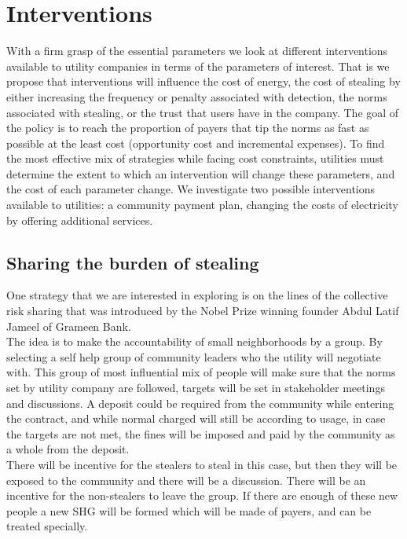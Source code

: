 \documentclass{article}
\begin{document}
\section{Interventions}
With a firm grasp of the essential parameters we look at different interventions available to utility companies in terms of the parameters of interest. That is we propose that interventions will influence the cost of energy, the cost of stealing by either increasing the frequency or penalty associated with detection, the norms associated with stealing, or the trust that users have in the company. The goal of the policy is to reach the proportion of payers that tip the norms as fast as possible at the least cost (opportunity cost and incremental expenses). To find the most effective mix of strategies while facing cost constraints, utilities must determine the extent to which an intervention will change these parameters, and the cost of each parameter change. We investigate two possible interventions available to utilities: a community payment plan, changing the costs of electricity by offering additional services. 

\listoftodos

\subsection{Sharing the burden of stealing}
One strategy that we are interested in exploring is on the lines of the collective risk sharing that was introduced by the Nobel Prize winning founder Abdul Latif Jameel of Grameen Bank. \\

The idea is to make the accountability of small neighborhoods by a group. By selecting a self help group of community leaders who the utility will negotiate with. This group of most influential mix of people will make sure that the norms set by utility company are followed, targets will be set in stakeholder meetings and discussions. A deposit could be required from the community while entering the contract, and while normal charged will still be according to usage, in case the targets are not met, the fines will be imposed and paid by the community as a whole from the deposit. \\

There will be incentive for the stealers to steal in this case, but then they will be exposed to the community and there will be a discussion. There will be an incentive for the non-stealers to leave the group. If there are enough of these new people a new SHG will be formed which will be made of payers, and can be treated specially.\\
\end{document}
